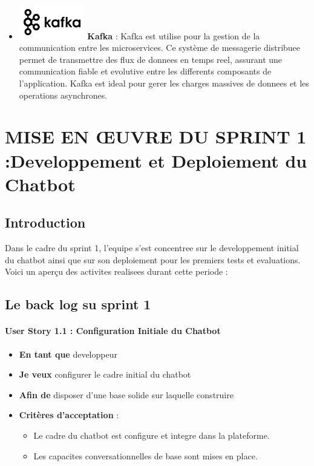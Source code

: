 \documentclass[a4paper, 11pt, openany]{report}
\begin{document}
\begin{itemize}
\item \includegraphics[height=1.5cm]{assets/images/kafka.png} \hspace{5pt} \textbf{Kafka}  : 
Kafka est utilise pour la gestion de la communication entre les microservices. Ce système de messagerie distribuee permet de transmettre des flux de donnees en temps reel, assurant une communication fiable et evolutive entre les differents composants de l'application. Kafka est ideal pour gerer les charges massives de donnees et les operations asynchrones.

\end{itemize}

\chapter{MISE EN ŒUVRE DU SPRINT 1 :Developpement et Deploiement du Chatbot}


\section{Introduction}
Dans le cadre du sprint 1, l'equipe s'est concentree sur le developpement initial du chatbot ainsi que sur son deploiement pour les premiers tests et evaluations. Voici un aperçu des activites realisees durant cette periode :


\section{Le back log su sprint 1}
\subsubsection{User Story 1.1 : Configuration Initiale du Chatbot}

\begin{itemize}
    \item \textbf{En tant que} developpeur
    \item \textbf{Je veux} configurer le cadre initial du chatbot
    \item \textbf{Afin de} disposer d’une base solide sur laquelle construire
    \item \textbf{Critères d’acceptation} :
    \begin{itemize}
        \item Le cadre du chatbot est configure et integre dans la plateforme.
        \item Les capacites conversationnelles de base sont mises en place.
    \end{itemize}
\end{itemize}
\end{document}
